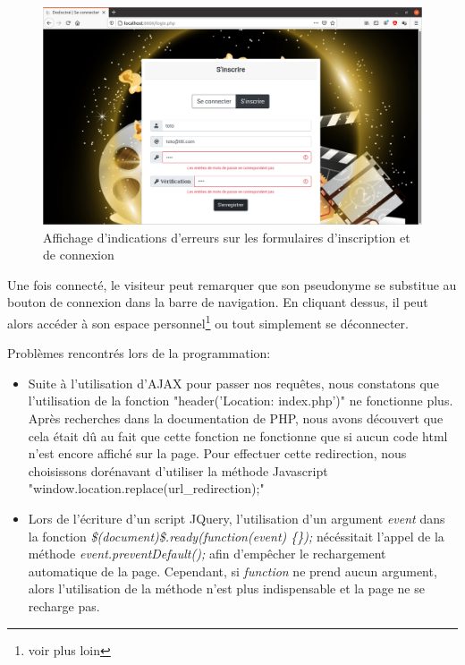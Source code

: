             \begin{figure}[!ht]
                \centering
                \includegraphics[width=12cm]{img/erreur-form.png}
                \caption{Affichage d'indications d'erreurs sur les formulaires d'inscription et de connexion}
            \end{figure}

            \medskip
            Une fois connecté, le visiteur peut remarquer que son pseudonyme se substitue au bouton de connexion dans la barre de navigation. En cliquant dessus, il peut alors accéder à son espace personnel\footnote{voir plus loin} ou tout simplement se déconnecter.


            \bigskip
            Problèmes rencontrés lors de la programmation:
            \begin{itemize}
                \item Suite à l'utilisation d'AJAX pour passer nos requêtes, nous constatons que l'utilisation de la fonction "header('Location: index.php')" ne fonctionne plus. Après recherches dans la documentation de PHP, nous avons découvert que cela était dû au fait que cette fonction ne fonctionne que si aucun code html n'est encore affiché sur la page. Pour effectuer cette redirection, nous choisissons dorénavant d'utiliser la méthode Javascript "window.location.replace(url\_redirection);"

                \item Lors de l'écriture d'un script JQuery, l'utilisation d'un argument {\itshape event} dans la fonction {\itshape \$(document)\$.ready(function(event) \{\});} nécéssitait l'appel de la méthode {\itshape event.preventDefault();} afin d'empêcher le rechargement automatique de la page. Cependant, si {\itshape function} ne prend aucun argument, alors l'utilisation de la méthode n'est plus indispensable et la page ne se recharge pas. 
            \end{itemize}


